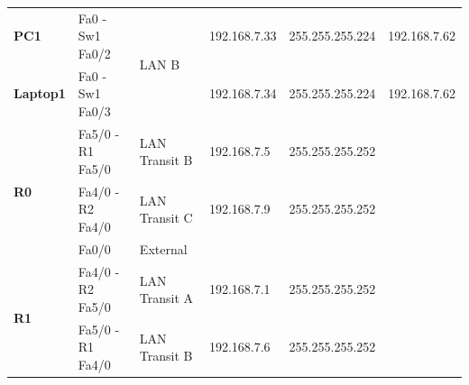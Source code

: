 \documentclass[11pt,a4paper]{report}
\begin{document}
\begin{center}
\begin{longtable}{@{}llllll@{}}
            \textbf{PC1}                                       & Fa0 - Sw1 Fa0/2                                          & \multirow{2}{*}{LAN B}                                & 192.168.7.33                                     & 255.255.255.224                                           & 192.168.7.62                                          \\* \cmidrule(r){1-2} \cmidrule(l){4-6}
            \textbf{Laptop1}                                   & Fa0 - Sw1 Fa0/3                                          &                                                       & 192.168.7.34                                     & 255.255.255.224                                           & 192.168.7.62                                          \\* \midrule
            \multirow{3}{*}{\textbf{R0}}                       & Fa5/0 - R1 Fa5/0                                         & LAN Transit B                                         & 192.168.7.5                                      & 255.255.255.252                                           &                                                       \\* \cmidrule(l){2-6}
                                                               & Fa4/0 - R2 Fa4/0                                         & LAN Transit C                                         & 192.168.7.9                                      & 255.255.255.252                                           &                                                       \\* \cmidrule(l){2-6}
                                                               & Fa0/0                                                    & External                                              &                                                  &                                                           &                                                       \\* \midrule
            \multirow{4}{*}{\textbf{R1}}                       & Fa4/0 - R2 Fa5/0                                         & LAN Transit A                                         & 192.168.7.1                                      & 255.255.255.252                                           &                                                       \\* \cmidrule(l){2-6}
                                                               & Fa5/0 - R1 Fa4/0                                         & LAN Transit B                                         & 192.168.7.6                                      & 255.255.255.252                                           &                                                       \\* \cmidrule(l){2-6}

\end{longtable}
\end{center}
\end{document}
